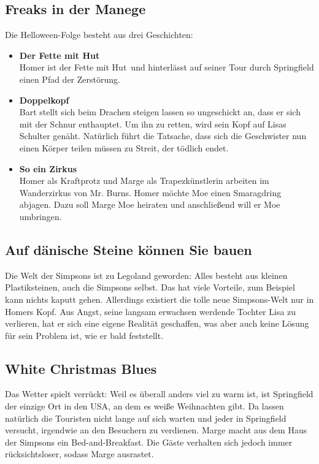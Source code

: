 \subsection{Freaks in der Manege}
Die Helloween-Folge besteht aus drei Geschichten:
\begin{itemize}
	\item \textbf{Der Fette mit Hut}\\ Homer ist \glqq der Fette mit Hut\grqq\ und hinterlässt auf seiner Tour durch Springfield einen Pfad der Zerstörung.
	\item \textbf{Doppelkopf}\\ Bart stellt sich beim Drachen steigen lassen so ungeschickt an, dass er sich mit der Schnur enthauptet. Um ihn zu retten, wird sein Kopf auf Lisas Schulter genäht. Natürlich führt die Tatsache, dass sich die Geschwister nun einen Körper teilen müssen zu Streit, der tödlich endet.
	\item \textbf{So ein Zirkus}\\ Homer als Kraftprotz und Marge als Trapezkünstlerin arbeiten im Wanderzirkus von Mr. Burns. Homer möchte Moe einen Smaragdring abjagen. Dazu soll Marge Moe heiraten und anschließend will er Moe umbringen.
\end{itemize}


\subsection{Auf dänische Steine können Sie bauen}
Die Welt der Simpsons ist zu Legoland geworden: Alles besteht aus kleinen Plastiksteinen, auch die Simpsons selbst. Das hat viele Vorteile, zum Beispiel kann nichts kaputt gehen. Allerdings existiert die tolle neue Simpsons-Welt nur in Homers Kopf. Aus Angst, seine langsam erwachsen werdende Tochter Lisa zu verlieren, hat er sich eine eigene Realität geschaffen, was aber auch keine Lösung für sein Problem ist, wie er bald feststellt.


\subsection{White Christmas Blues}\label{SABF01}
Das Wetter spielt verrückt: Weil es überall anders viel zu warm ist, ist Springfield der einzige Ort in den USA, an dem es weiße Weihnachten gibt. Da lassen natürlich die Touristen nicht lange auf sich warten und jeder in Springfield versucht, irgendwie an den Besuchern zu verdienen. Marge macht aus dem Haus der Simpsons ein Bed-and-Breakfast. Die Gäste verhalten sich jedoch immer rücksichtsloser, sodass Marge ausrastet.

